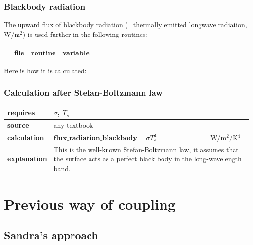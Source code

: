 \documentclass[a4paper,titlepage]{scrartcl}
\begin{document}
\subsubsection{Blackbody radiation}
The upward flux of blackbody radiation (=thermally emitted longwave radiation, W/m$^2$) is used further in the following routines:

\begin{tabular}{llll}
  \hline \hline
  & file & routine & variable \\ 
  \hline
  \hline \hline
\end{tabular}

Here is how it is calculated:

\subsubsection*{Calculation after Stefan-Boltzmann law}
\begin{tabular}{|lll|}
  \hline
  \textbf{requires} & \multicolumn{2}{p{12cm}|}{$\sigma$, $T_s$ } \\
  \hline
  \textbf{source}   & any textbook & \\
  \hline
  \textbf{calculation} & $\mathbf{flux\_radiation\_blackbody} = \sigma T_s^4$  & W/m$^2$/K$^4$ \\
  \hline
	\textbf{explanation} & \multicolumn{2}{p{12cm}|}{This is the well-known Stefan-Boltzmann law, it assumes that the surface acts as a perfect black body in the long-wavelength band.} \\
	\hline
\end{tabular}

\newpage
\section{Previous way of coupling}

\subsection{Sandra's approach}
\end{document}
